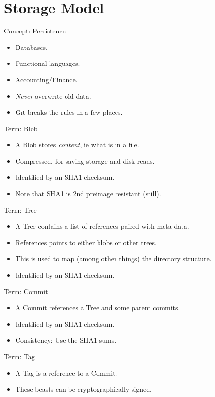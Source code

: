 \documentclass[xcolor=pdftex,dvipsnames]{beamer}
\begin{document}
\section{Storage Model}
\begin{frame}{Concept: Persistence}
  \begin{itemize}
  \item Databases.
  \item Functional languages.
  \item Accounting/Finance.
  \item \emph{Never} overwrite old data.
  \item Git breaks the rules in a few places.
  \end{itemize}
\end{frame}
\begin{frame}{Term: Blob}
  \begin{itemize}
  \item A Blob stores \emph{content}, ie what is in a file.
  \item Compressed, for saving storage and disk reads.
  \item Identified by an SHA1 checksum.
  \item Note that SHA1 is 2nd preimage resistant (still).
  \end{itemize}
\end{frame}
\begin{frame}{Term: Tree}
  \begin{itemize}
  \item A Tree contains a list of references paired with meta-data.
  \item References points to either blobs or other trees.
  \item This is used to map (among other things) the directory
    structure.
  \item Identified by an SHA1 checksum.
  \end{itemize}
\end{frame}
\begin{frame}{Term: Commit}
  \begin{itemize}
  \item A Commit references a Tree and some parent commits.
  \item Identified by an SHA1 checksum.
  \item Consistency: Use the SHA1-sums.
  \end{itemize}
\end{frame}
\begin{frame}{Term: Tag}
  \begin{itemize}
  \item A Tag is a reference to a Commit.
  \item These beasts can be cryptographically signed.
  \end{itemize}
\end{frame}
\end{document}
